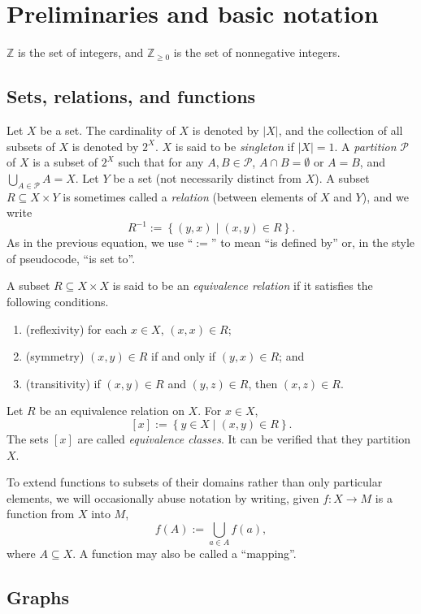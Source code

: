 \documentclass{amsart}
\theoremstyle{plain}
\theoremstyle{definition}
\theoremstyle{definition}
\begin{document}
\section{Preliminaries and basic notation}\label{sec:prelim}

$\mathbb{Z}$ is the set of integers, and $\mathbb{Z}_{\geq 0}$ is the set of
nonnegative integers.

\subsection{Sets, relations, and functions}
Let $X$ be a set.  The cardinality of $X$ is denoted by $\lvert X \rvert$, and the
collection of all subsets of $X$ is denoted by $2^X$.  $X$ is said to be
\textit{singleton} if $\lvert X \rvert = 1$.  A \textit{partition} $\mathcal{P}$
of $X$ is a subset of $2^X$ such that for any $A,B\in \mathcal{P}$, $A\cap B =
\emptyset$ or $A=B$, and $\bigcup_{A\in \mathcal{P}}A = X$.  Let $Y$ be a set
(not necessarily distinct from $X$).  A subset $R\subseteq X\times Y$ is
sometimes called a \textit{relation} (between elements of $X$ and $Y$), and we
write
\[
R^{-1} := \left\{ (y,x) \mid (x,y)\in R \right\} .
\]
As in the previous equation, we use ``$:=$'' to mean ``is defined by'' or, in
the style of pseudocode, ``is set to''.

A subset $R\subseteq X\times X$ is said to be an \textit{equivalence relation}
if it satisfies the following conditions.
\begin{enumerate}
\item (reflexivity) for each $x\in X$, $(x,x)\in R$;
\item (symmetry) $(x,y)\in R$ if and only if $(y,x) \in R$; and
\item (transitivity) if $(x,y)\in R$ and $(y,z)\in R$, then $(x,z)\in R$.
\end{enumerate}
Let $R$ be an equivalence relation on $X$. For $x\in X$,
\[
[x] := \left\{ y\in X \mid (x,y)\in R \right\} .
\]
The sets $[x]$ are called \textit{equivalence classes}.  It can be verified that
they partition $X$.

To extend functions to subsets of their domains rather than only particular
elements, we will occasionally abuse notation by writing, given $f:X\rightarrow
M$ is a function from $X$ into $M$,
\[
f(A) := \bigcup_{a\in A}f(a) ,
\]
where $A\subseteq X$.  A function may also be called a ``mapping''.


\subsection{Graphs}
\end{document}
